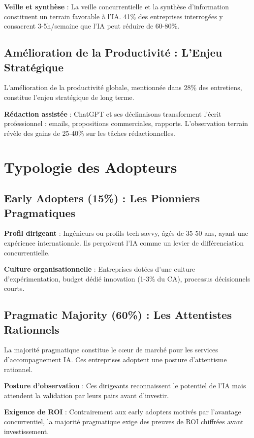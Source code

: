 \documentclass[12pt,a4paper]{report}
\begin{document}
\textbf{Veille et synthèse} : La veille concurrentielle et la synthèse d'information constituent un terrain favorable à l'IA. 41\% des entreprises interrogées y consacrent 3-5h/semaine que l'IA peut réduire de 60-80\%.

\subsection{Amélioration de la Productivité : L'Enjeu Stratégique}

L'amélioration de la productivité globale, mentionnée dans 28\% des entretiens, constitue l'enjeu stratégique de long terme.

\textbf{Rédaction assistée} : ChatGPT et ses déclinaisons transforment l'écrit professionnel : emails, propositions commerciales, rapports. L'observation terrain révèle des gains de 25-40\% sur les tâches rédactionnelles.

\section{Typologie des Adopteurs}

\subsection{Early Adopters (15\%) : Les Pionniers Pragmatiques}

\textbf{Profil dirigeant} : Ingénieurs ou profils tech-savvy, âgés de 35-50 ans, ayant une expérience internationale. Ils perçoivent l'IA comme un levier de différenciation concurrentielle.

\textbf{Culture organisationnelle} : Entreprises dotées d'une culture d'expérimentation, budget dédié innovation (1-3\% du CA), processus décisionnels courts.

\subsection{Pragmatic Majority (60\%) : Les Attentistes Rationnels}

La majorité pragmatique constitue le cœur de marché pour les services d'accompagnement IA. Ces entreprises adoptent une posture d'attentisme rationnel.

\textbf{Posture d'observation} : Ces dirigeants reconnaissent le potentiel de l'IA mais attendent la validation par leurs pairs avant d'investir.

\textbf{Exigence de ROI} : Contrairement aux early adopters motivés par l'avantage concurrentiel, la majorité pragmatique exige des preuves de ROI chiffrées avant investissement.
\end{document}
